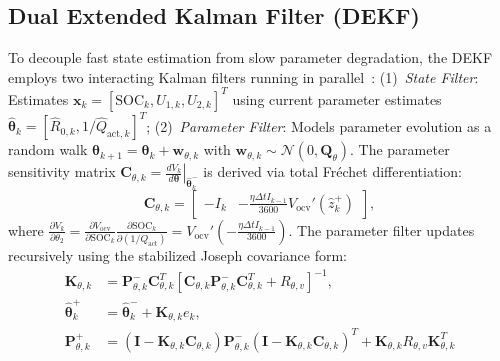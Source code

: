 \documentclass[preprint,12pt]{elsarticle}
\begin{document}
\subsection{Dual Extended Kalman Filter (DEKF)}
To decouple fast state estimation from slow parameter degradation, the DEKF employs two interacting Kalman filters running in parallel~\cite{Plett2004part3,Charkhgard2010dekf}: (1)~\emph{State Filter}: Estimates $\mathbf{x}_k = [\text{SOC}_k, U_{1,k}, U_{2,k}]^T$ using current parameter estimates $\hat{\boldsymbol{\theta}}_k = [\hat{R}_{0,k}, 1/\hat{Q}_{\text{act},k}]^T$; (2)~\emph{Parameter Filter}: Models parameter evolution as a random walk $\boldsymbol{\theta}_{k+1} = \boldsymbol{\theta}_k + \mathbf{w}_{\theta,k}$ with $\mathbf{w}_{\theta,k} \sim \mathcal{N}(0, \mathbf{Q}_\theta)$. The parameter sensitivity matrix $\mathbf{C}_{\theta,k} = \left. \frac{d V_k}{d \boldsymbol{\theta}} \right|_{\hat{\boldsymbol{\theta}}_k^-}$ is derived via total Fréchet differentiation:
\begin{equation}\label{eqn:dekf_param_jacobian}
\mathbf{C}_{\theta,k} = \begin{bmatrix} -I_k & -\frac{\eta \Delta t I_{k-1}}{3600} V_{\text{ocv}}'(\hat{z}_k^+) \end{bmatrix},
\end{equation}
where $\frac{\partial V_k}{\partial \theta_2} = \frac{\partial V_{\text{ocv}}}{\partial \text{SOC}_k} \frac{\partial \text{SOC}_k}{\partial (1/Q_{\text{act}})} = V_{\text{ocv}}' \left(-\frac{\eta \Delta t I_{k-1}}{3600}\right)$. The parameter filter updates recursively using the stabilized Joseph covariance form:
\begin{align}
\mathbf{K}_{\theta,k} &= \mathbf{P}_{\theta,k}^- \mathbf{C}_{\theta,k}^T [ \mathbf{C}_{\theta,k} \mathbf{P}_{\theta,k}^- \mathbf{C}_{\theta,k}^T + R_{\theta,v} ]^{-1}, \label{eqn:dekf_param_gain}\\
\hat{\boldsymbol{\theta}}_k^+ &= \hat{\boldsymbol{\theta}}_k^- + \mathbf{K}_{\theta,k} e_k, \label{eqn:dekf_param_upd}\\
\mathbf{P}_{\theta,k}^+ &= (\mathbf{I} - \mathbf{K}_{\theta,k} \mathbf{C}_{\theta,k}) \mathbf{P}_{\theta,k}^- (\mathbf{I} - \mathbf{K}_{\theta,k} \mathbf{C}_{\theta,k})^T + \mathbf{K}_{\theta,k} R_{\theta,v} \mathbf{K}_{\theta,k}^T \label{eqn:dekf_param_cov}
\end{align}
\end{document}

